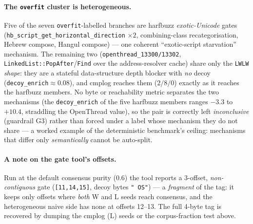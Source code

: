 \documentclass[11pt]{article}
\begin{document}
\paragraph{The \texttt{overfit} cluster is heterogeneous.} Five of the seven
\texttt{overfit}-labelled branches are harfbuzz \emph{exotic-Unicode} gates
(\texttt{hb\_script\_get\_horizontal\_direction} $\times2$, combining-class
recategorisation, Hebrew compose, Hangul compose) --- one coherent
``exotic-script starvation'' mechanism. The remaining two
(\texttt{openthread\_13300/13302}, \texttt{LinkedList::PopAfter}/\texttt{Find}
over the address-resolver cache) share only the \texttt{LWLW} \emph{shape}: they
are a stateful data-structure depth blocker with \emph{no} decoy
(\texttt{decoy\_enrich}$\approx0.08$), and cmplog reaches them ($2/8/0$) exactly
as it reaches the harfbuzz members. No byte or reachability metric separates the
two mechanisms (the \texttt{decoy\_enrich} of the five harfbuzz members ranges
$-3.3$ to $+10.4$, straddling the OpenThread value), so the pair is correctly
left \emph{inconclusive} (guardrail G3) rather than forced under a label whose
mechanism they do not share --- a worked example of the deterministic benchmark's
ceiling: mechanisms that differ only \emph{semantically} cannot be auto-split.

\paragraph{A note on the gate tool's offsets.} Run at the default consensus
purity ($0.6$) the tool reports a 3-offset, \emph{non-contiguous} gate
(\texttt{[11,14,15]}, decoy bytes \texttt{" OS"}) --- a \emph{fragment} of the
tag: it keeps only offsets where \emph{both} W and L seeds reach consensus, and
the heterogeneous naive side has none at offsets 12--13. The full 4-byte tag is
recovered by dumping the cmplog (L) seeds or the corpus-fraction test above.

\end{document}
